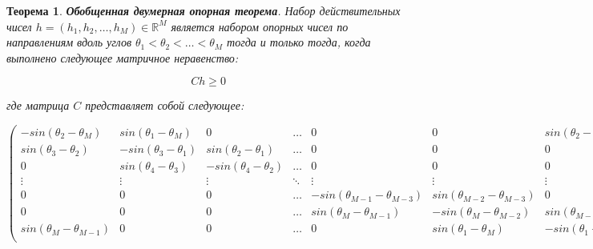 \documentclass[a4paper, 12pt, titlepage]{article}
\theoremstyle{definition}
\theoremstyle{plain}
\newtheorem{SmartTheorem}{Теорема}
\begin{document}
\begin{SmartTheorem}
 \label{thm:ext-support-theorem-2d}
 \textbf{Обобщенная двумерная опорная теорема}.
 Набор действительных чисел
 $h = (h_{1}, h_{2}, \ldots, h_{M}) \in \mathbb{R}^{M}$
 является набором опорных чисел по направлениям вдоль углов
 $\theta_{1} < \theta_{2} < \ldots < \theta_{M}$ тогда и только тогда, когда
 выполнено следующее матричное неравенство:

 \begin{equation}
 C h \geq 0
 \end{equation}

 где матрица $C$ представляет собой следующее:

 \begin{equation}
  \left(
  \begin{array}{ccccccc}

   \scriptstyle     -sin(\theta_{2} - \theta_{M}) &
   \scriptstyle     sin(\theta_{1} - \theta_{M}) &
   \scriptstyle     0 &
   \scriptstyle     \ldots &
   \scriptstyle     0 &
   \scriptstyle     0 &
   \scriptstyle     sin(\theta_{2} - \theta_{1}) \\

   \scriptstyle      sin(\theta_{3} - \theta_{2}) &
   \scriptstyle      -sin(\theta_{3} - \theta_{1}) &
   \scriptstyle      sin(\theta_{2} - \theta_{1}) &
   \scriptstyle      \ldots &
   \scriptstyle      0 &
   \scriptstyle      0 &
   \scriptstyle      0 \\

   \scriptstyle      0 &
   \scriptstyle      sin(\theta_{4} - \theta_{3}) &
   \scriptstyle      -sin(\theta_{4} - \theta_{2}) &
   \scriptstyle      \ldots &
   \scriptstyle      0 &
   \scriptstyle      0 &
   \scriptstyle      0 \\

   \scriptstyle      \vdots &
   \scriptstyle      \vdots &
   \scriptstyle      \vdots &
   \scriptstyle      \ddots &
   \scriptstyle      \vdots &
   \scriptstyle      \vdots &
   \scriptstyle      \vdots \\

   \scriptstyle      0 &
   \scriptstyle      0 &
   \scriptstyle      0 &
   \scriptstyle      \ldots &
   \scriptstyle      -sin(\theta_{M - 1} - \theta_{M - 3}) &
   \scriptstyle      sin(\theta_{M - 2} - \theta_{M - 3}) &
   \scriptstyle      0 \\

   \scriptstyle      0 &
   \scriptstyle      0 &
   \scriptstyle      0 &
   \scriptstyle      \ldots &
   \scriptstyle      sin(\theta_{M} - \theta_{M - 1}) &
   \scriptstyle      -sin(\theta_{M} - \theta_{M - 2}) &
   \scriptstyle      sin(\theta_{M - 1} - \theta_{M - 2}) \\

   \scriptstyle      sin(\theta_{M} - \theta_{M - 1}) &
   \scriptstyle      0 &
   \scriptstyle      0 &
   \scriptstyle      \ldots &
   \scriptstyle      0 &
   \scriptstyle      sin(\theta_{1} - \theta_{M}) &
   \scriptstyle      -sin(\theta_{1} - \theta_{M - 1}) \\
  \end{array}
  \right)
 \end{equation}
\end{SmartTheorem}
\end{document}
